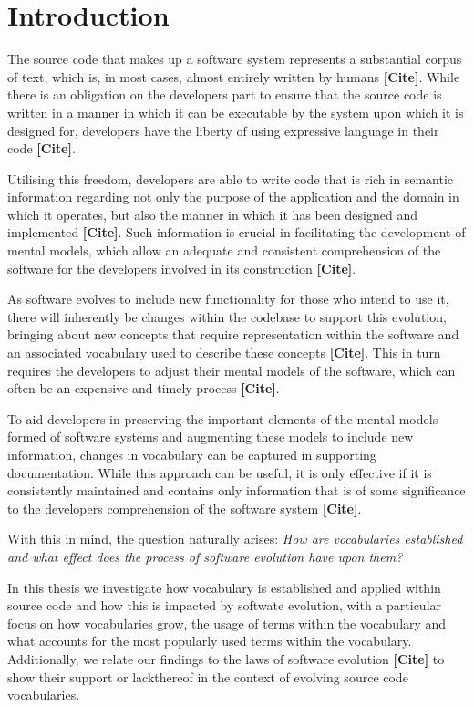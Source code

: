 \chapter{Introduction}
\label{chapter:Introduction} 

The source code that makes up a software system represents a substantial corpus of text, which is, in most cases, almost entirely written by humans \textbf{[Cite]}. While there is an obligation on the developers part to ensure that the source code is written in a manner in which it can be executable by the system upon which it is designed for, developers have the liberty of using expressive language in their code \textbf{[Cite]}.

Utilising this freedom, developers are able to write code that is rich in semantic information regarding not only the purpose of the application and the domain in which it operates, but also the manner in which it has been designed and implemented \textbf{[Cite]}. Such information is crucial in facilitating the development of mental models, which allow an adequate and consistent comprehension of the software for the developers involved in its construction \textbf{[Cite]}.

As software evolves to include new functionality for those who intend to use it, there will inherently be changes within the codebase to support this evolution, bringing about new concepts that require representation within the software and an associated vocabulary used to describe these concepts \textbf{[Cite]}. This in turn requires the developers to adjust their mental models of the software, which can often be an expensive and timely process \textbf{[Cite]}.

To aid developers in preserving the important elements of the mental models formed of software systems and augmenting these models to include new information, changes in vocabulary can be captured in supporting documentation. While this approach can be useful, it is only effective if it is consistently maintained and contains only information that is of some significance to the developers comprehension of the software system \textbf{[Cite]}.

With this in mind, the question naturally arises: \emph{How are vocabularies established and what effect does the process of software evolution have upon them?}

In this thesis we investigate how vocabulary is established and applied within source code and how this is impacted by softwate evolution, with a particular focus on how vocabularies grow, the usage of terms within the vocabulary and what accounts for the most popularly used terms within the vocabulary. Additionally, we relate our findings to the laws of software evolution \textbf{[Cite]} to show their support or lackthereof in the context of evolving source code vocabularies.


